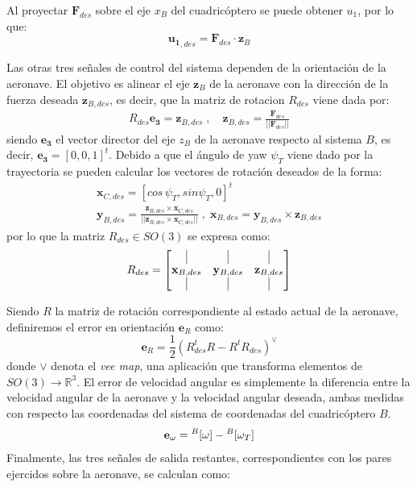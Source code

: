 Al proyectar $\mathbf{F}_{des}$ sobre el eje $x_B$ del cuadricóptero se puede obtener $u_1$, por lo que:
\begin{equation}
	\mathbf{u_1}_{,des} = \mathbf{F}_{des}\cdot \mathbf{z}_B
\end{equation}

Las otras tres señales de control del sistema dependen de la orientación de la aeronave. El objetivo es alinear el eje $\mathbf{z}_B$ de la aeronave con la dirección de la fuerza deseada $\mathbf{z}_{B,des}$, es decir, que la matriz de rotacion $R_{des}$ viene dada por:
\begin{align}	
	R_{des}\mathbf{e_3} = \mathbf{z}_{B,des}\;,\quad 
\mathbf{z}_{B,des} = \frac{\mathbf{F}_{des}}{||\mathbf{F}_{des}||}
\end{align}
siendo $\mathbf{e_3}$ el vector director del eje $z_B$ de la aeronave respecto al sistema $B$, es decir, $\mathbf{e_3} = [0, 0, 1]^t$.
Debido a que el ángulo de yaw $\psi_T$ viene dado por la trayectoria se pueden calcular los vectores de rotación deseados de la forma:
\begin{gather}
	\mathbf{x}_{C,des} = [cos\, \psi_T , sin \psi_T, 0]^t\\
	\mathbf{y}_{B,des} = \frac{\mathbf{z}_{B,des}\times\mathbf{x}_{C,des}}{||\mathbf{z}_{B,des}\times\mathbf{x}_{C,des}||}\;,\; \mathbf{x}_{B,des} = \mathbf{y}_{B,des} \times\mathbf{z}_{B,des}
\end{gather}
por lo que la matriz $R_{des} \in SO(3)$ se expresa como:
\begin{equation}
	R_{des}=
	\begin{bmatrix}
		\vrule&\vrule&\vrule\\
		\mathbf{x}_{B,des}&\mathbf{y}_{B,des}&\mathbf{z}_{B,des}\\
		\vrule&\vrule&\vrule
	\end{bmatrix}
\end{equation}

Siendo $R$ la matriz de rotación correspondiente al estado actual de la aeronave, definiremos el error en orientación $\mathbf{e}_R $ como:
\begin{equation}
	\mathbf{e}_R = \frac{1}{2}\left(R_{des}^t R - R^t R_{des} \right)^\vee
\end{equation}
donde $\vee$ denota el \textit{vee map}, una aplicación que transforma elementos de $SO(3) \rightarrow \mathbb{R}^3$. El error de velocidad angular es simplemente la diferencia entre la velocidad angular de la aeronave y la velocidad angular deseada, ambas medidas con respecto las coordenadas del sistema de coordenadas del cuadricóptero $B$.
\begin{equation}
	\mathbf{e}_\omega = \null^B[\omega]-\null^B[\omega_T] 
\end{equation}
Finalmente, las tres señales de salida restantes, correspondientes con los pares ejercidos sobre la aeronave, se calculan como:

